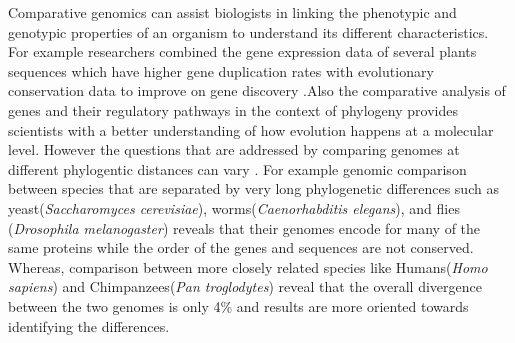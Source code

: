 Comparative genomics can assist biologists in linking the phenotypic and genotypic properties of an organism to understand its different characteristics. For example researchers combined the gene expression data of several plants sequences which have higher gene duplication rates with evolutionary conservation data to improve on gene discovery \cite{hanada2008importance}.Also the comparative analysis of genes and their regulatory pathways in the context of phylogeny provides scientists with a better understanding of how evolution happens at a molecular level\cite{soltis2003role}. However the questions that are addressed by comparing genomes at different phylogentic distances can vary \cite{hardison2003comparative}. For example genomic comparison between species that are separated by very long phylogenetic differences such as yeast(\textit{Saccharomyces cerevisiae}), worms(\textit{Caenorhabditis
elegans}), and flies (\textit{Drosophila melanogaster}) reveals that their genomes encode for many of the same proteins while the order of the genes and sequences are not conserved\cite{rubin2000comparative}. Whereas, comparison between more closely related species like Humans(\textit{Homo sapiens}) and Chimpanzees(\textit{Pan troglodytes}) reveal that the overall divergence between the two genomes is only 4\% and results are more oriented towards identifying the differences\cite{varki2005comparing}. 

